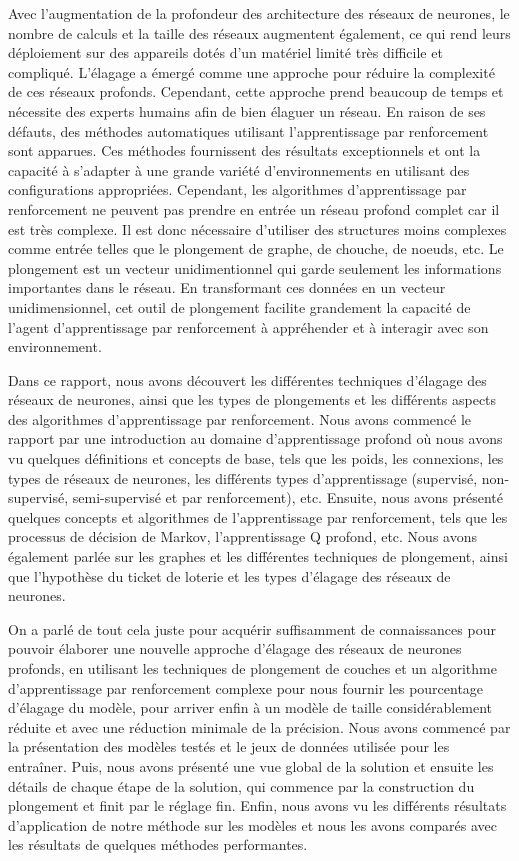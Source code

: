 Avec l'augmentation de la profondeur des architecture des réseaux de neurones, le nombre de calculs et la taille des réseaux augmentent également, ce qui rend leurs déploiement sur des appareils dotés d'un matériel limité très difficile et compliqué. L'élagage a émergé comme une approche pour réduire la complexité de ces réseaux profonds. Cependant, cette approche prend beaucoup de temps et nécessite des experts humains afin de bien élaguer un réseau. En raison de ses défauts, des méthodes automatiques utilisant l'apprentissage par renforcement sont apparues. Ces méthodes fournissent des résultats exceptionnels et ont la capacité à s'adapter à une grande variété d'environnements en utilisant des configurations appropriées. Cependant, les algorithmes d'apprentissage par renforcement ne peuvent pas prendre en entrée un réseau profond complet car il est très complexe. Il est donc nécessaire d'utiliser des structures moins complexes comme entrée telles que le plongement de graphe, de chouche, de noeuds, etc. Le plongement est un vecteur unidimentionnel qui garde seulement les informations importantes dans le réseau. En transformant ces données en un vecteur unidimensionnel, cet outil de plongement facilite grandement la capacité de l'agent d'apprentissage par renforcement à appréhender et à interagir avec son environnement.

Dans ce rapport, nous avons découvert les différentes techniques d'élagage des réseaux de neurones, ainsi que les types de plongements et les différents aspects des algorithmes d'apprentissage par renforcement. Nous avons commencé le rapport par une introduction au domaine d'apprentissage profond où nous avons vu quelques définitions et concepts de base, tels que les poids, les connexions, les types de réseaux de neurones, les différents types d'apprentissage (supervisé, non-supervisé, semi-supervisé et par renforcement), etc. Ensuite, nous avons présenté quelques concepts et algorithmes de l'apprentissage par renforcement, tels que les processus de décision de Markov, l'apprentissage Q profond, etc. Nous avons également parlée sur les graphes et les différentes techniques de plongement, ainsi que l'hypothèse du ticket de loterie et les types d'élagage des réseaux de neurones.

On a parlé de tout cela juste pour acquérir suffisamment de connaissances pour pouvoir élaborer une nouvelle approche d'élagage des réseaux de neurones profonds, en utilisant les techniques de plongement de couches et un algorithme d'apprentissage par renforcement complexe pour nous fournir les pourcentage d'élagage du modèle, pour arriver enfin à un modèle de taille considérablement réduite et avec une réduction minimale de la précision. Nous avons commencé par la présentation des modèles testés et le jeux de données utilisée pour les entraîner. Puis, nous avons présenté une vue global de la solution et ensuite les détails de chaque étape de la solution, qui commence par la construction du plongement et finit par le réglage fin. Enfin, nous avons vu les différents résultats d'application de notre méthode sur les modèles et nous les avons comparés avec les résultats de quelques méthodes performantes.

